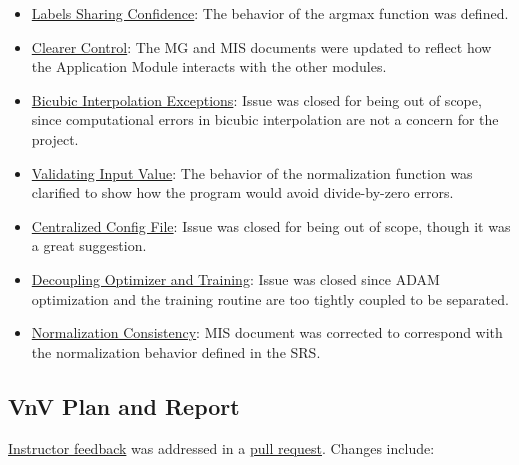 \documentclass{article}
\begin{document}
\begin{itemize}
  \item \href{https://github.com/ptrandev/OCRacle/issues/27}{Labels Sharing Confidence}:
  The behavior of the argmax function was defined.
  \item \href{https://github.com/ptrandev/OCRacle/issues/26}{Clearer Control}:
  The MG and MIS documents were updated to reflect how the Application Module
  interacts with the other modules.
  \item \href{https://github.com/ptrandev/OCRacle/issues/25}{Bicubic Interpolation Exceptions}:
  Issue was closed for being out of scope, since computational errors in bicubic
  interpolation are not a concern for the project.
  \item \href{https://github.com/ptrandev/OCRacle/issues/24}{Validating Input Value}:
  The behavior of the normalization function was clarified to show how the program
  would avoid divide-by-zero errors.
  \item \href{https://github.com/ptrandev/OCRacle/issues/23}{Centralized Config File}:
  Issue was closed for being out of scope, though it was a great suggestion.
  \item \href{https://github.com/ptrandev/OCRacle/issues/22}{Decoupling Optimizer and Training}:
  Issue was closed since ADAM optimization and the training routine are too tightly
  coupled to be separated.
  \item \href{https://github.com/ptrandev/OCRacle/issues/21}{Normalization Consistency}:
  MIS document was corrected to correspond with the normalization behavior defined in the SRS.
\end{itemize}

\subsection{VnV Plan and Report}

\href{https://github.com/ptrandev/OCRacle/issues/10}{Instructor feedback} was addressed in
a \href{https://github.com/ptrandev/OCRacle/pull/29}{pull request}. Changes include:
\end{document}
